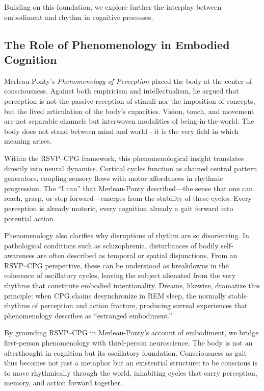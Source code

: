 \documentclass{article}
\begin{document}
Building on this foundation, we explore further the interplay between embodiment and rhythm in cognitive processes.
\subsection{The Role of Phenomenology in Embodied Cognition}

Merleau-Ponty’s \emph{Phenomenology of Perception} \citep{merleauponty2013phenomenology} placed the body at the center of consciousness. Against both empiricism and intellectualism, he argued that perception is not the passive reception of stimuli nor the imposition of concepts, but the lived articulation of the body’s capacities. Vision, touch, and movement are not separable channels but interwoven modalities of being-in-the-world. The body does not stand between mind and world—it is the very field in which meaning arises.

Within the RSVP--CPG framework, this phenomenological insight translates directly into neural dynamics. Cortical cycles function as chained central pattern generators, coupling sensory flows with motor affordances in rhythmic progression. The “I can” that Merleau-Ponty described—the sense that one can reach, grasp, or step forward—emerges from the stability of these cycles. Every perception is already motoric, every cognition already a gait forward into potential action.

Phenomenology also clarifies why disruptions of rhythm are so disorienting. In pathological conditions such as schizophrenia, disturbances of bodily self-awareness are often described as temporal or spatial disjunctions. From an RSVP--CPG perspective, these can be understood as breakdowns in the coherence of oscillatory cycles, leaving the subject alienated from the very rhythms that constitute embodied intentionality. Dreams, likewise, dramatize this principle: when CPG chains desynchronize in REM sleep, the normally stable rhythms of perception and action fracture, producing surreal experiences that phenomenology describes as “estranged embodiment.”

By grounding RSVP--CPG in Merleau-Ponty’s account of embodiment, we bridge first-person phenomenology with third-person neuroscience. The body is not an afterthought in cognition but its oscillatory foundation. Consciousness as gait thus becomes not just a metaphor but an existential structure: to be conscious is to move rhythmically through the world, inhabiting cycles that carry perception, memory, and action forward together.
\end{document}
